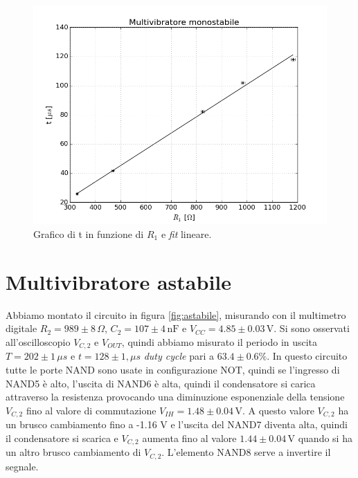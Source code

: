 \documentclass[10pt,a4paper]{article}
\begin{document}
\begin{figure}[!htb]
  \centering
  \includegraphics[scale=0.5]{fitmonostabile.png}
\caption{Grafico di t in funzione di $R_1$ e \emph{fit} lineare.\label{fit:monostabile}}
\end{figure}


\section{Multivibratore astabile}
Abbiamo montato il circuito in figura \ref{fig:astabile}, misurando con il multimetro digitale $R_2= 989\pm8\,\Omega$, $C_2= 107\pm4 \,\text{nF} $ e $V_{CC}= 4.85\pm0.03\,\text{V}$. Si sono osservati all'oscilloscopio $V_{C,2}$ e $V_{OUT}$, quindi abbiamo misurato il periodo in uscita $T= 202\pm1\,\mu s $ e $t= 128\pm1,\mu s $ \emph{duty cycle} pari a $63.4\pm0.6\%$. In questo circuito tutte le porte NAND sono usate in configurazione NOT, quindi se l'ingresso di NAND5 è alto, l'uscita di NAND6 è alta, quindi il condensatore si carica attraverso la resistenza provocando una diminuzione esponenziale della tensione $V_{C,2}$ fino al valore di commutazione $V_{IH}=1.48\pm0.04\,\text{V}$. A questo valore $V_{C,2}$ ha un brusco cambiamento fino a -1.16 V e l'uscita del NAND7 diventa alta, quindi il condensatore si scarica e $V_{C,2}$ aumenta fino al valore $1.44\pm0.04\,\text{V}$ quando si ha un altro brusco cambiamento di $V_{C,2}$. L'elemento NAND8 serve a invertire il segnale.

\end{document}
